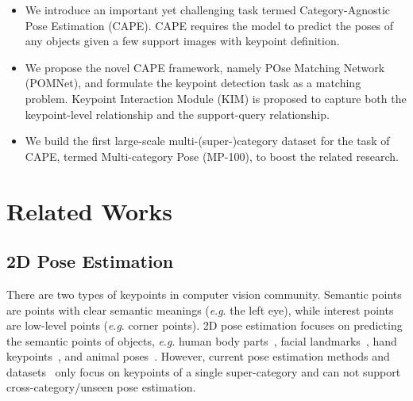 \documentclass[runningheads]{llncs}
\newcommand{\eg}{\textit{e}.\textit{g}. }
\begin{document}
\begin{itemize}

\item We introduce an important yet challenging task termed Category-Agnostic Pose Estimation (CAPE). CAPE requires the model to predict the poses of any objects given a few support images with keypoint definition.

\item We propose the novel CAPE framework, namely POse Matching Network (POMNet), and formulate the keypoint detection task as a matching problem. Keypoint Interaction Module (KIM) is proposed to capture both the keypoint-level relationship and the support-query relationship.

\item We build the first large-scale multi-(super-)category dataset for the task of CAPE, termed Multi-category Pose (MP-100), to boost the related research. 

\end{itemize}


\section{Related Works}

\subsection{2D Pose Estimation}

There are two types of keypoints in computer vision community. Semantic points are points with clear semantic meanings (\eg the left eye), while interest points are low-level points (\eg corner points).
2D pose estimation focuses on predicting the semantic points of objects, \eg human body parts~\cite{duan2019trb,jin2020whole,lin2014microsoft}, facial landmarks~\cite{bulat2017far}, hand keypoints~\cite{zimmermann2017learning}, and animal poses~\cite{cao2019cross}.
However, current pose estimation methods and datasets~\cite{ge2019deepfashion2,lin2014microsoft,yu2021ap} only focus on keypoints of a single super-category and can not support cross-category/unseen pose estimation.
\end{document}
